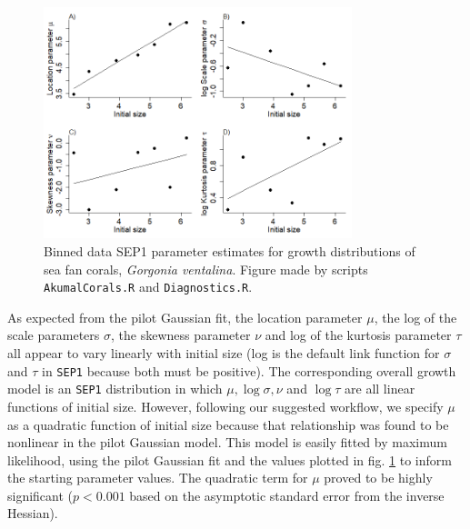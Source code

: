 \documentclass[11pt]{article}
\begin{document}
{\begin{figure}[tbp]
\centering
\includegraphics[width=0.8\textwidth]{figures/AkumalRollingSEP1pars.png}
\caption{Binned data SEP1 parameter estimates for growth distributions of sea fan corals, \emph{Gorgonia ventalina}. 
Figure made by scripts \texttt{AkumalCorals.R} and \texttt{Diagnostics.R}.}
\label{fig:AkumalRollingSEP1pars}
\end{figure} 

As expected from the pilot Gaussian fit, the location parameter $\mu$, the log of the scale parameters $\sigma$, the 
skewness parameter $\nu$ and log of the kurtosis parameter $\tau$ all appear to vary linearly with initial size 
(log is the default link function for $\sigma$ and $\tau$ in \texttt{SEP1} because both must be positive).
The corresponding overall growth model is an \texttt{SEP1} distribution in 
which $\mu, \log \sigma, \nu$ and $\log \tau$ are all linear functions of initial size.
However, following our suggested workflow, we specify $\mu$ as a quadratic function of initial size because that relationship
was found to be nonlinear in the pilot Gaussian model. This model is easily fitted by maximum likelihood, 
using the pilot Gaussian fit and the values plotted in fig. \ref{fig:AkumalRollingSEP1pars} to 
inform the starting parameter values. The quadratic term for $\mu$ proved to be highly significant
($p<0.001$ based on the asymptotic standard error from the inverse Hessian). 

}
\end{document}
